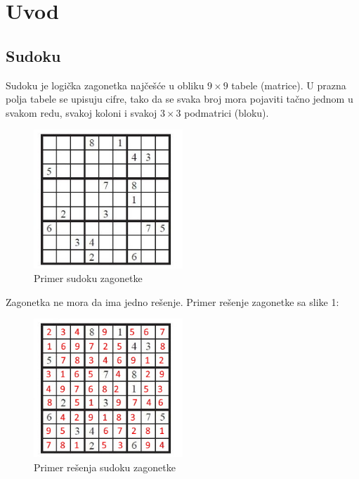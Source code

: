\documentclass[a4paper]{article}
\begin{document}
    
    
    
    \section{Uvod}
    \subsection{Sudoku}
    Sudoku je logička zagonetka najčešće u obliku $9 \times 9$ tabele (matrice).
    U prazna polja tabele se upisuju cifre, tako da se svaka broj mora pojaviti
    tačno jednom u svakom redu, svakoj koloni i svakoj $3\times 3$ podmatrici (bloku).
    \begin{figure}[h]
        \centering
        \includegraphics[width=0.5\textwidth, height=0.5\textwidth]{img/sudoku-example.jpg}
        \caption{Primer sudoku zagonetke}
    \end{figure}
    \par Zagonetka ne mora da ima jedno rešenje. Primer rešenje zagonetke sa slike 1:
    \begin{figure}[h]
        \centering
        \includegraphics[width=0.5\textwidth, height=0.5\textwidth]{img/sudoku-example-sol.jpg}
        \caption{Primer rešenja sudoku zagonetke}
    \end{figure}
\end{document}
